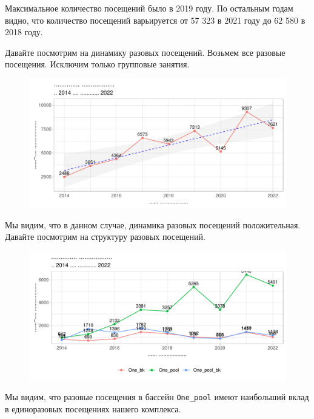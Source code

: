 \documentclass[
  letterpaper,
  DIV=11,
  numbers=noendperiod]{scrartcl}
\begin{document}
Максимальное количество посещений было в 2019 году. По остальным годам
видно, что количество посещений варьируется от 57 323 в 2021 году до 62
580 в 2018 году.

Давайте посмотрим на динамику разовых посещений. Возьмем все разовые
посещения. Исключим только групповые занятия.

\begin{figure}

{\centering \includegraphics{./intro_files/figure-pdf/unnamed-chunk-12-1.pdf}

}

\end{figure}

Мы видим, что в данном случае, динамика разовых посещений положительная.
Давайте посмотрим на структуру разовых посещений.

\begin{figure}

{\centering \includegraphics{./intro_files/figure-pdf/unnamed-chunk-13-1.pdf}

}

\end{figure}

Мы видим, что разовые посещения в бассейн \texttt{One\_pool} имеют
наибольший вклад в единоразовых посещениях нашего комплекса.
\end{document}
